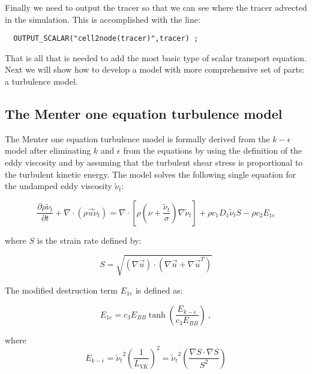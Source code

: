 \documentclass[letterpaper,twoside]{article}
\begin{document}
Finally we need to output the tracer so that we can see where the
tracer advected in the simulation.  This is accomplished with the line:
\begin{verbatim}
  OUTPUT_SCALAR("cell2node(tracer)",tracer) ;
\end{verbatim}
That is all that is needed to add the most basic type of scalar
transport equation.  Next we will show how to develop a model with
more comprehensive set of parts: a turbulence model.

\subsection{The Menter one equation turbulence model}

The Menter one equation turbulence model\cite{Menter.97} is formally
derived from the $k-\epsilon$ model after eliminating $k$ and
$\epsilon$ from the equations by using the definition of the eddy
viscosity and by assuming that the turbulent shear stress is
proportional to the turbulent kinetic energy.  The model solves the
following single equation for the undamped eddy viscosity
$\tilde{\nu}_t$:

\begin{equation}
\frac{\partial \rho \tilde{\nu}_t}{\partial t} + \nabla \cdot \left (\rho \vec{u} \tilde{\nu}_t\right) =
\nabla \cdot \left[ \rho \left( \nu + \frac{\tilde{\nu}_t}{\sigma} \right) \nabla \tilde{\nu}_t \right] +
\rho c_1 D_1 \tilde{\nu}_t S - \rho c_2 E_{1e} 
\label{eq:MTR}
\end{equation}

\noindent
where $S$ is the strain rate defined by:

\begin{equation}
S = \sqrt { \left(\nabla \vec{u}\right) \cdot \left( \nabla \vec{u} + \nabla \vec{u}^{T} \right)}
\end{equation}


\noindent
The modified destruction term $E_{1e}$ is defined as:

\begin{equation}
E_{1e} = c_3 E_{BB} \tanh {\left ( \frac{E_{k-\epsilon}}{c_3 E_{BB}} \right )} \ ,
\end{equation}

\noindent
where
\begin{equation}
E_{k-\epsilon} = {\tilde{\nu}_t}^2 \left ( \frac{1}{L_{VK}} \right )^2 = 
{\tilde{\nu}_t}^2 \left ( \frac{\nabla S \cdot \nabla S}{S^2} \right )
\end{equation}
\end{document}
